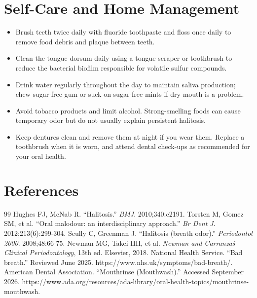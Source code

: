 \section*{Self-Care and Home Management}
\begin{itemize}
 \item Brush teeth twice daily with fluoride toothpaste and floss once daily to remove food debris and plaque between teeth.
 \item Clean the tongue dorsum daily using a tongue scraper or toothbrush to reduce the bacterial biofilm responsible for volatile sulfur compounds.
 \item Drink water regularly throughout the day to maintain saliva production; chew sugar-free gum or suck on sugar-free mints if dry mouth is a problem.
 \item Avoid tobacco products and limit alcohol. Strong-smelling foods can cause temporary odor but do not usually explain persistent halitosis.
 \item Keep dentures clean and remove them at night if you wear them. Replace a toothbrush when it is worn, and attend dental check-ups as recommended for your oral health.
\end{itemize}

\section*{References}
\begin{thebibliography}{99}
 Hughes FJ, McNab R. ``Halitosis.'' \textit{BMJ}. 2010;340:c2191.
 Torsten M, Gomez SM, et al. ``Oral malodour: an interdisciplinary approach.'' \textit{Br Dent J}. 2012;213(6):299-304.
 Scully C, Greenman J. ``Halitosis (breath odor).'' \textit{Periodontol 2000}. 2008;48:66-75.
 Newman MG, Takei HH, et al. \textit{Newman and Carranza\'s Clinical Periodontology}, 13th ed. Elsevier, 2018.
 National Health Service. ``Bad breath.'' Reviewed June 2025. https://www.nhs.uk/symptoms/bad-breath/.
 American Dental Association. ``Mouthrinse (Mouthwash).'' Accessed September 2026. https://www.ada.org/resources/ada-library/oral-health-topics/mouthrinse-mouthwash.
\end{thebibliography}
